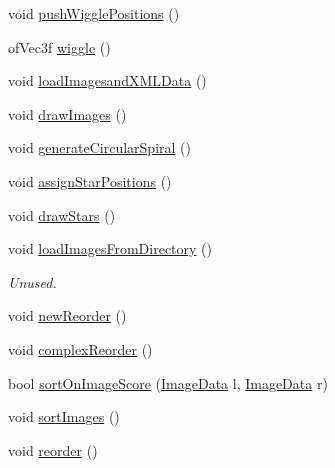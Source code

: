 \begin{DoxyCompactItemize}
\item 
void \hyperlink{group___wiggle_gaaa5c2175be1d5ca404c3c23a898d0cdd}{push\-Wiggle\-Positions} ()
\item 
of\-Vec3f \hyperlink{group___wiggle_gacd718eb54b9dc2b45e463414c24de6b9}{wiggle} ()
\item 
void \hyperlink{classtest_app_aa93380112b906e2aac2d8738309b2d17}{load\-Imagesand\-X\-M\-L\-Data} ()
\item 
void \hyperlink{classtest_app_a6dbcb5f1e47c842dfd1ab6b188097677}{draw\-Images} ()
\item 
void \hyperlink{classtest_app_aa30f4f1db2d186466f97e6ca15169712}{generate\-Circular\-Spiral} ()
\item 
void \hyperlink{group___drawing_stars_ga57e6d61c73ba0244b9d7a8c227aec244}{assign\-Star\-Positions} ()
\item 
void \hyperlink{group___drawing_stars_ga3ea688a73ca9eb760a3f0a07fde0ac10}{draw\-Stars} ()
\item 
void \hyperlink{classtest_app_afcb51e1a0b9152b9f6e6b102959bab51}{load\-Images\-From\-Directory} ()
\begin{DoxyCompactList}\small\item\em Unused. \end{DoxyCompactList}\item 
void \hyperlink{classtest_app_a98baf4cdf9fa0f0a56056322b4e7f7e7}{new\-Reorder} ()
\item 
void \hyperlink{classtest_app_abaca61ce3e4c1b6ce726c907915acf80}{complex\-Reorder} ()
\item 
bool \hyperlink{classtest_app_a81cf913142d9512f9d1063cb7e71199b}{sort\-On\-Image\-Score} (\hyperlink{struct_image_data}{Image\-Data} l, \hyperlink{struct_image_data}{Image\-Data} r)
\item 
void \hyperlink{classtest_app_a8a5d9dd51b5c7058ed88611b6ab2b57d}{sort\-Images} ()
\item 
void \hyperlink{classtest_app_ab3aec1217fe6743f4ec9ed762148f627}{reorder} ()
\end{DoxyCompactItemize}
